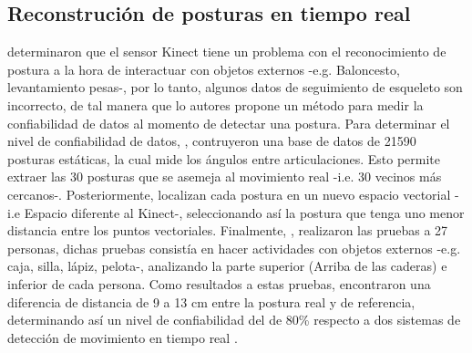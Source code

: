 \subsection{Reconstruci\'on de posturas en tiempo real} \label{tr:2}
 determinaron que el sensor Kinect tiene un problema con el reconocimiento de postura a la hora de interactuar con objetos externos -e.g. Baloncesto, levantamiento pesas-, por lo tanto, algunos datos de seguimiento de esqueleto son incorrecto, de tal manera que lo autores propone un m\'etodo para medir la confiabilidad de datos al momento de detectar una postura.
\medbreak
Para determinar el nivel de confiabilidad de datos, , contruyeron una base de datos de 21590 posturas est\'aticas, la cual mide los \'angulos entre articulaciones. Esto permite  extraer las 30 posturas que se asemeja al movimiento real -i.e. 30 vecinos m\'as cercanos-.  Posteriormente, localizan cada postura en un nuevo espacio vectorial -i.e Espacio diferente al Kinect-, seleccionando as\'i la postura que tenga uno menor distancia entre los puntos vectoriales.
\medbreak
Finalmente, , realizaron las pruebas a 27 personas, dichas pruebas consist\'ia en hacer actividades con objetos externos -e.g. caja, silla, l\'apiz, pelota-, analizando la parte superior (Arriba de las caderas) e inferior de cada persona. Como resultados a estas pruebas, encontraron una diferencia de distancia de 9 a 13 cm entre la postura real y de referencia, determinando as\'i un nivel de confiabilidad del de 80\% respecto a dos sistemas de detecci\'on de movimiento en tiempo real \cite{shum2011fast,shum2012real}.
